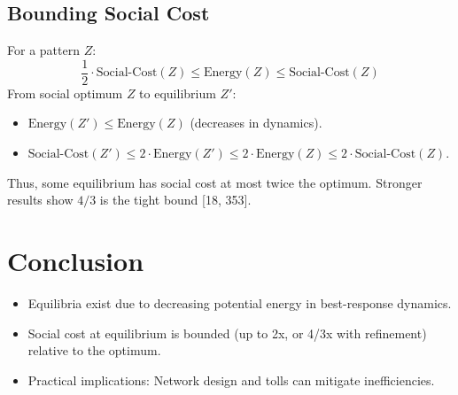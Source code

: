 \documentclass[a4paper,12pt]{article}
\begin{document}
\subsection{Bounding Social Cost}
For a pattern \( Z \):
\[
\frac{1}{2} \cdot \text{Social-Cost}(Z) \leq \text{Energy}(Z) \leq \text{Social-Cost}(Z)
\]
From social optimum \( Z \) to equilibrium \( Z' \):
\begin{itemize}
    \item \( \text{Energy}(Z') \leq \text{Energy}(Z) \) (decreases in dynamics).
    \item \( \text{Social-Cost}(Z') \leq 2 \cdot \text{Energy}(Z') \leq 2 \cdot \text{Energy}(Z) \leq 2 \cdot \text{Social-Cost}(Z) \).
\end{itemize}
Thus, some equilibrium has social cost at most twice the optimum. Stronger results show \( 4/3 \) is the tight bound [18, 353].

\section{Conclusion}
\begin{itemize}
    \item Equilibria exist due to decreasing potential energy in best-response dynamics.
    \item Social cost at equilibrium is bounded (up to 2x, or 4/3x with refinement) relative to the optimum.
    \item Practical implications: Network design and tolls can mitigate inefficiencies.
\end{itemize}
\end{document}
